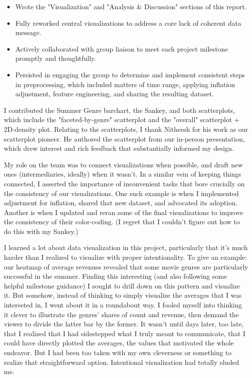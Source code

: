 \documentclass[12pt]{article}
\begin{document}
\begin{itemize}
    \item Wrote the "Visualization" and "Analysis \& Discussion" sections of this report.
    \item Fully reworked central visualizations to address a core lack of coherent data message. 
    \item Actively collaborated with group liaison to meet each project milestone promptly and thoughtfully.
    \item Persisted in engaging the group to determine and implement consistent steps in preprocessing, which included matters of time range, applying inflation adjustment,  feature engineering, and sharing the resulting dataset.

\end{itemize}

I contributed the Summer Genre barchart, the Sankey, and both scatterplots, which include the "faceted-by-genre" scatterplot  and the "overall" scatterplot + 2D-density plot. Relating to the scatterplots, I thank Nitheesh for his work as our scatterplot pioneer. He authored the scatterplot from our in-person presentation, which drew interest and rich feedback that substantially informed my design.

My role on the team was to connect visualizations when possible, and draft new ones (intermediaries, ideally) when it wasn't. In a similar vein of keeping things connected, I asserted the importance of inconvenient tasks that bore crucially on the consistency of our visualizations. One such example is when I implemented adjustment for inflation, shared that new dataset, and advocated its adoption. Another is when I updated and reran some of the final visualizations to improve the consistency of their color-coding. (I regret that I couldn't figure out how to do this with my Sankey.)

I learned a lot about data visualization in this project, particularly that it's much harder than I realized to visualize with proper intentionality. To give an example: our heatmap of average revenues revealed that some movie genres are particularly successful in the summer. Finding this interesting (and also following some helpful milestone guidance) I sought to drill down on this pattern and visualize it. But somehow, instead of thinking to simply visualize the averages that I was interested in, I went about it in a roundabout way. I fooled myself into thinking it clever to illustrate the genres' shares of count and revenue, then demand the viewer to divide the latter bar by the former. It wasn't until days later, too late, that I realized that I had sidestepped what I truly meant to communicate, that I could have directly plotted the averages, the values that motivated the whole endeavor. But I had been too taken with my own cleverness or something to realize that straightforward option. Intentional visualization had totally eluded me.
\end{document}
